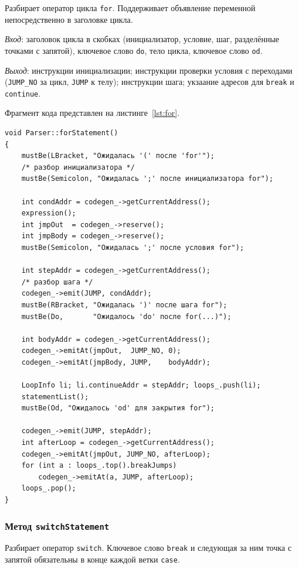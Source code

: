 \documentclass[a4paper,final]{article}
\begin{document}
Разбирает оператор цикла \texttt{for}. Поддерживает объявление переменной
непосредственно в заголовке цикла.

\textit{Вход}: заголовок цикла в скобках (инициализатор, условие, шаг,
разделённые точками с запятой), ключевое слово \texttt{do}, тело цикла,
ключевое слово \texttt{od}.

\textit{Выход}: инструкции инициализации; инструкции проверки условия с
переходами (\texttt{JUMP\_NO} за цикл, \texttt{JUMP} к телу); инструкции
шага; укзаание адресов для \texttt{break} и \texttt{continue}.

Фрагмент кода представлен на листинге~\ref{lst:for}.

\begin{lstlisting}[caption={Метод Parser::forStatement (фрагмент)}, label=lst:for]
void Parser::forStatement()
{
    mustBe(LBracket, "Ожидалась '(' после 'for'");
    /* разбор инициализатора */
    mustBe(Semicolon, "Ожидалась ';' после инициализатора for");

    int condAddr = codegen_->getCurrentAddress();
    expression();
    int jmpOut  = codegen_->reserve();
    int jmpBody = codegen_->reserve();
    mustBe(Semicolon, "Ожидалась ';' после условия for");

    int stepAddr = codegen_->getCurrentAddress();
    /* разбор шага */
    codegen_->emit(JUMP, condAddr);
    mustBe(RBracket, "Ожидалась ')' после шага for");
    mustBe(Do,       "Ожидалось 'do' после for(...)");

    int bodyAddr = codegen_->getCurrentAddress();
    codegen_->emitAt(jmpOut,  JUMP_NO, 0);
    codegen_->emitAt(jmpBody, JUMP,    bodyAddr);

    LoopInfo li; li.continueAddr = stepAddr; loops_.push(li);
    statementList();
    mustBe(Od, "Ожидалось 'od' для закрытия for");

    codegen_->emit(JUMP, stepAddr);
    int afterLoop = codegen_->getCurrentAddress();
    codegen_->emitAt(jmpOut, JUMP_NO, afterLoop);
    for (int a : loops_.top().breakJumps)
        codegen_->emitAt(a, JUMP, afterLoop);
    loops_.pop();
}
\end{lstlisting}

\subsubsection*{Метод \texttt{switchStatement}}

Разбирает оператор \texttt{switch}. Ключевое слово \texttt{break}
и следующая за ним точка с запятой обязательны в конце каждой ветки
\texttt{case}.
\end{document}
